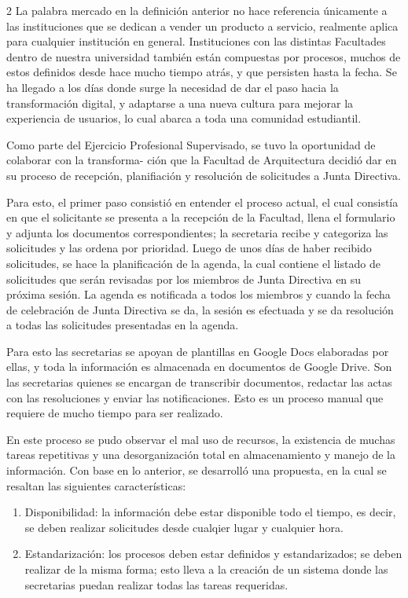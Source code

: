 \documentclass[12pt,spanish,Letterpaper,openany]{book}
\begin{document}
\begin {multicols}{2}
La palabra mercado en la definición anterior no hace referencia únicamente a las instituciones que se dedican a vender un producto a servicio, realmente aplica para cualquier institución en general. Instituciones con las distintas Facultades dentro de nuestra universidad también están compuestas por procesos, muchos de estos definidos desde hace mucho tiempo atrás, y que persisten hasta la fecha. Se ha llegado a los días donde surge la necesidad de dar el paso hacia la transformación digital, y adaptarse a una nueva cultura para mejorar la experiencia de usuarios, lo cual abarca a toda una comunidad estudiantil.

Como parte del Ejercicio Profesional Supervisado, se tuvo la oportunidad de colaborar con la transforma-
ción que la Facultad de Arquitectura decidió dar en su proceso de recepción, planifiación y resolución de solicitudes a Junta Directiva.

Para esto, el primer paso consistió en entender el proceso actual, el cual consistía en que el solicitante se presenta a la recepción de la Facultad, llena el formulario y adjunta los documentos correspondientes; la secretaria recibe y categoriza las solicitudes y las ordena por prioridad. Luego de unos días de haber recibido solicitudes, se hace la planificación de la agenda, la cual contiene el listado de solicitudes que serán revisadas por los miembros de Junta Directiva en su próxima sesión. La agenda es notificada a todos los miembros y cuando la fecha de celebración de Junta Directiva se da, la sesión es efectuada y se da resolución a todas las solicitudes presentadas en la agenda.

Para esto las secretarias se apoyan de plantillas en Google Docs elaboradas por ellas, y toda la información es almacenada en documentos de Google Drive. Son las secretarias quienes se encargan de transcribir documentos, redactar las actas con las resoluciones y enviar las notificaciones. Esto es un proceso manual que requiere de mucho tiempo para ser realizado.

En este proceso se pudo observar el mal uso de recursos, la existencia de muchas tareas repetitivas y una desorganización total en almacenamiento y manejo de la información. Con base en lo anterior, se desarrolló una propuesta, en la cual se resaltan las siguientes características:

\begin{enumerate}
\def\labelenumi{\alph{enumi}.}
\item
  Disponibilidad: la información debe estar disponible todo el tiempo, es decir, se deben realizar solicitudes desde cualqier lugar
  y cualquier hora.
\item
  Estandarización: los procesos deben estar definidos y estandarizados; se deben realizar de la misma forma; esto lleva a la creación
  de un sistema donde las secretarias puedan realizar todas las tareas requeridas.
\end{enumerate}


\end{multicols}
\end{document}
